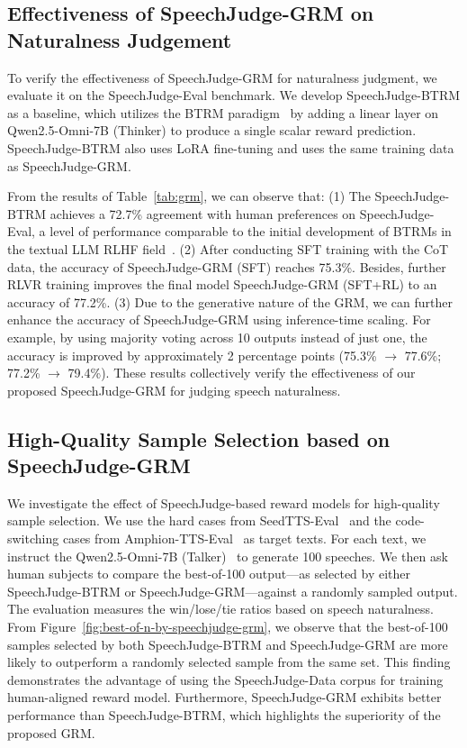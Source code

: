 \documentclass[]{bytedance_seed}
\begin{document}
\subsection{Effectiveness of SpeechJudge-GRM on Naturalness Judgement}\label{sec:grm-results}

To verify the effectiveness of SpeechJudge-GRM for naturalness judgment, we evaluate it on the SpeechJudge-Eval benchmark. We develop SpeechJudge-BTRM as a baseline, which utilizes the BTRM paradigm~\citep{bt-rm,dpo} by adding a linear layer on Qwen2.5-Omni-7B (Thinker) to produce a single scalar reward prediction. SpeechJudge-BTRM also uses LoRA fine-tuning and uses the same training data as SpeechJudge-GRM.

From the results of Table~\ref{tab:grm}, we can observe that: (1) The SpeechJudge-BTRM achieves a 72.7\% agreement with human preferences on SpeechJudge-Eval, a level of performance comparable to the initial development of BTRMs in the textual LLM RLHF field~\citep{openai-rm,RLHF-anthoropic,instructgpt}. (2) After conducting SFT training with the CoT data, the accuracy of SpeechJudge-GRM (SFT) reaches 75.3\%. Besides, further RLVR training improves the final model SpeechJudge-GRM (SFT+RL) to an accuracy of 77.2\%. (3) Due to the generative nature of the GRM, we can further enhance the accuracy of SpeechJudge-GRM using inference-time scaling. For example, by using majority voting across 10 outputs instead of just one, the accuracy is improved by approximately 2 percentage points (75.3\% $\rightarrow$ 77.6\%; 77.2\% $\rightarrow$ 79.4\%). These results collectively verify the effectiveness of our proposed SpeechJudge-GRM for judging speech naturalness.


\subsection{High-Quality Sample Selection based on SpeechJudge-GRM}\label{sec:sample-selection}

We investigate the effect of SpeechJudge-based reward models for high-quality sample selection. We use the hard cases from SeedTTS-Eval~\citep{seedtts} and the code-switching cases from Amphion-TTS-Eval~\citep{amphion} as target texts. For each text, we instruct the Qwen2.5-Omni-7B (Talker)~\citep{qwen2.5} to generate 100 speeches. We then ask human subjects to compare the best-of-100 output—as selected by either SpeechJudge-BTRM or SpeechJudge-GRM—against a randomly sampled output. The evaluation measures the win/lose/tie ratios based on speech naturalness. From Figure~\ref{fig:best-of-n-by-speechjudge-grm}, we observe that the best-of-100 samples selected by both SpeechJudge-BTRM and SpeechJudge-GRM are more likely to outperform a randomly selected sample from the same set. This finding demonstrates the advantage of using the SpeechJudge-Data corpus for training human-aligned reward model. Furthermore, SpeechJudge-GRM exhibits better performance than SpeechJudge-BTRM, which highlights the superiority of the proposed GRM.
\end{document}

